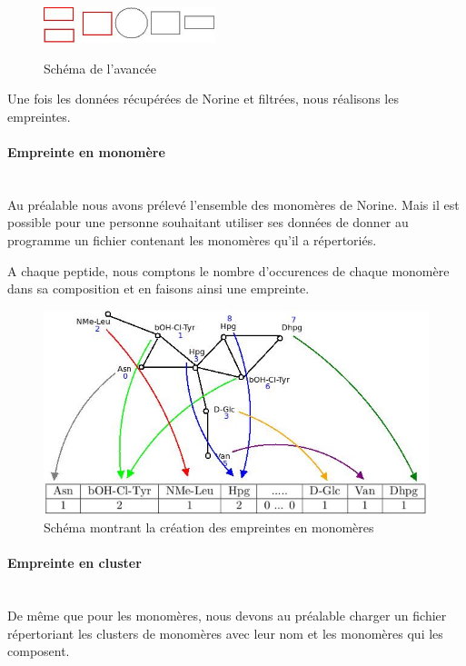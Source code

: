 \documentclass[a4paper,10pt]{report}
\begin{document}
	\begin{figure}[!h]
	    \begin{center}
	      \includegraphics[width=5cm]{image/step2.jpeg} \\
	      \caption{Schéma de l'avancée}
	    \end{center}
	 \end{figure}
	 
	Une fois les données récupérées de Norine et filtrées, nous réalisons les empreintes.
	
	\paragraph{Empreinte en monomère}
	    ~\\
	    Au préalable nous avons prélevé l'ensemble des monomères de Norine. Mais il est possible pour une personne souhaitant utiliser ses données de donner au programme un fichier contenant les monomères qu'il a répertoriés.
	    
	    A chaque peptide, nous comptons le nombre d'occurences de chaque monomère dans sa composition et en faisons ainsi une empreinte.
	    
	   \begin{figure}[h]
	    \includegraphics[scale = 0.5]{image/vanco_monoB.jpeg}
	    \caption{Schéma montrant la création des empreintes en monomères}
	    \end{figure}
	
	    
	\paragraph{Empreinte en cluster}
	~\\
	  De même que pour les monomères, nous devons au préalable charger un fichier répertoriant les clusters de monomères avec leur nom et les monomères qui les composent.
	  
\end{document}
